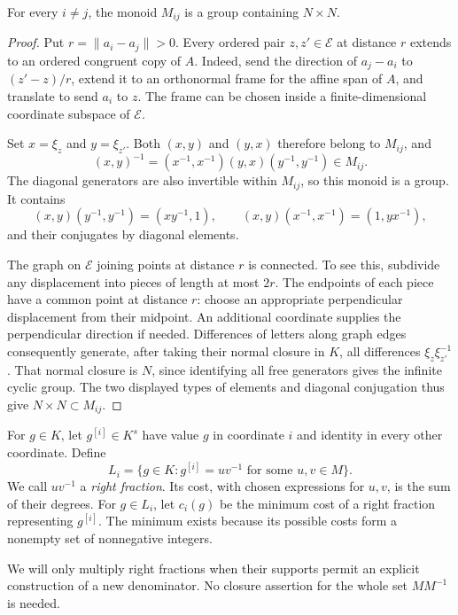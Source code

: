 \begin{lemma}\label{groups:pairs}
For every $i\ne j$, the monoid $M_{ij}$ is a group containing
$N\times N$.
\end{lemma}
\begin{proof}
Put $r=\|a_i-a_j\|>0$.  Every ordered pair $z,z'\in\mathcal E$
at distance $r$ extends to an ordered congruent copy of $A$.
Indeed, send the direction of $a_j-a_i$ to $(z'-z)/r$, extend it to
an orthonormal frame for the affine span of $A$, and translate to send
$a_i$ to $z$.  The frame can be chosen inside a finite-dimensional
coordinate subspace of $\mathcal E$.

Set $x=\xi_z$ and $y=\xi_{z'}$.  Both $(x,y)$ and $(y,x)$ therefore
belong to $M_{ij}$, and
\[
 (x,y)^{-1}
   =(x^{-1},x^{-1})(y,x)(y^{-1},y^{-1})\in M_{ij}.
\]
The diagonal generators are also invertible within $M_{ij}$, so this
monoid is a group.  It contains
\[
 (x,y)(y^{-1},y^{-1})=(xy^{-1},1),
 \qquad
 (x,y)(x^{-1},x^{-1})=(1,yx^{-1}),
\]
and their conjugates by diagonal elements.

The graph on $\mathcal E$ joining points at distance $r$ is connected.
To see this, subdivide any displacement into pieces of length at most
$2r$.  The endpoints of each piece have a common point at distance $r$:
choose an appropriate perpendicular displacement from their midpoint.
An additional coordinate supplies the perpendicular direction if needed.
Differences of letters along graph edges consequently generate, after
taking their normal closure in $K$, all differences $\xi_z\xi_{z'}^{-1}$.
That normal closure is $N$, since identifying all free generators gives
the infinite cyclic group.  The two displayed types of elements and
diagonal conjugation thus give $N\times N\subset M_{ij}$.
\end{proof}

For $g\in K$, let $g^{[i]}\in K^s$ have value $g$ in coordinate $i$
and identity in every other coordinate.  Define
\[
 L_i=\{g\in K:g^{[i]}=uv^{-1}\text{ for some }u,v\in M\}.
\]
We call $uv^{-1}$ a \emph{right fraction}.  Its cost, with chosen
expressions for $u,v$, is the sum of their degrees.  For $g\in L_i$,
let $c_i(g)$ be the minimum cost of a right fraction representing
$g^{[i]}$.  The minimum exists because its possible costs form a
nonempty set of nonnegative integers.

We will only multiply right fractions when their supports permit an
explicit construction of a new denominator.  No closure assertion for
the whole set $MM^{-1}$ is needed.

